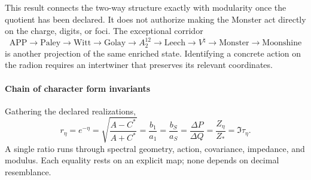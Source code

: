 This result connects the two-way structure exactly with modularity once
the quotient has been declared. It does not authorize making the Monster act directly
on the charge, digits, or foci. The exceptional corridor
\[
\mathrm{APP}\to\mathrm{Paley}\to\mathrm{Witt}\to\mathrm{Golay}
\to A_2^{12}\to\mathrm{Leech}\to V^\natural
\to\mathrm{Monster}\to\mathrm{Moonshine}
\]
is another projection of the same enriched state. Identifying a concrete
action on the radion requires an intertwiner that preserves its
relevant coordinates.

\paragraph{Chain of character form invariants}

Gathering the declared realizations,
\begin{equation}
\boxed{
r_\eta=e^{-\eta}
=\sqrt{\frac{A-C^*}{A+C^*}}
=\frac{b_1}{a_1}
=\frac{b_S}{a_S}
=\frac{\Delta P}{\Delta Q}
=\frac{Z_\eta}{Z_*}
=\Im\tau_\eta.}
\label{eq:shape-master}
\end{equation}
A single ratio runs through spectral geometry, action, covariance, impedance, and modulus. Each equality rests on an explicit map; none depends on decimal resemblance.


